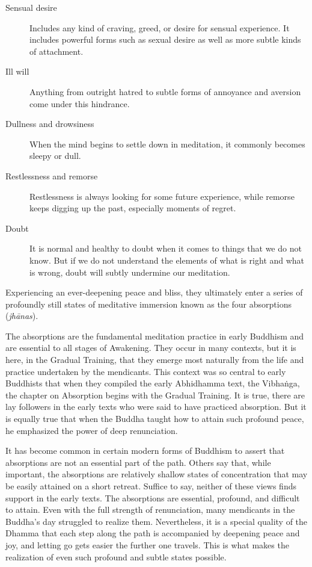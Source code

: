 \documentclass[12pt,openany]{book}%
\begin{document}
\begin{description}%
\item[Sensual desire] Includes any kind of craving, greed, or desire for sensual experience. It includes powerful forms such as sexual desire as well as more subtle kinds of attachment.%
\item[Ill will] Anything from outright hatred to subtle forms of annoyance and aversion come under this hindrance.%
\item[Dullness and drowsiness] When the mind begins to settle down in meditation, it commonly becomes sleepy or dull.%
\item[Restlessness and remorse] Restlessness is always looking for some future experience, while remorse keeps digging up the past, especially moments of regret.%
\item[Doubt] It is normal and healthy to doubt when it comes to things that we do not know. But if we do not understand the elements of what is right and what is wrong, doubt will subtly undermine our meditation.%
\end{description}

Experiencing an ever-deepening peace and bliss, they ultimately enter a series of profoundly still states of meditative immersion known as the four absorptions (\textit{\textsanskrit{jhānas}}).

The absorptions are the fundamental meditation practice in early Buddhism and are essential to all stages of Awakening. They occur in many contexts, but it is here, in the Gradual Training, that they emerge most naturally from the life and practice undertaken by the mendicants. This context was so central to early Buddhists that when they compiled the early Abhidhamma text, the \textsanskrit{Vibhaṅga}, the chapter on Absorption begins with the Gradual Training. It is true, there are lay followers in the early texts who were said to have practiced absorption. But it is equally true that when the Buddha taught how to attain such profound peace, he emphasized the power of deep renunciation.

It has become common in certain modern forms of Buddhism to assert that absorptions are not an essential part of the path. Others say that, while important, the absorptions are relatively shallow states of concentration that may be easily attained on a short retreat. Suffice to say, neither of these views finds support in the early texts. The absorptions are essential, profound, and difficult to attain. Even with the full strength of renunciation, many mendicants in the Buddha’s day struggled to realize them. Nevertheless, it is a special quality of the Dhamma that each step along the path is accompanied by deepening peace and joy, and letting go gets easier the further one travels. This is what makes the realization of even such profound and subtle states possible.
\end{document}

